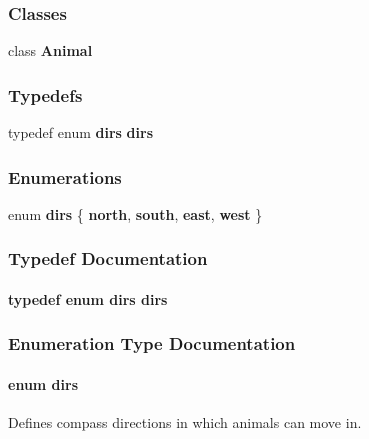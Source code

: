 \subsubsection*{Classes}
\begin{DoxyCompactItemize}
\item 
class {\bf Animal}
\end{DoxyCompactItemize}
\subsubsection*{Typedefs}
\begin{DoxyCompactItemize}
\item 
typedef enum {\bf dirs} {\bf dirs}
\end{DoxyCompactItemize}
\subsubsection*{Enumerations}
\begin{DoxyCompactItemize}
\item 
enum {\bf dirs} \{ {\bf north}, 
{\bf south}, 
{\bf east}, 
{\bf west}
 \}
\end{DoxyCompactItemize}


\subsubsection{Typedef Documentation}
\paragraph[{dirs}]{\setlength{\rightskip}{0pt plus 5cm}typedef enum {\bf dirs}
 {\bf dirs}}\label{_animal_8h_ab87e8be2cafe2008c5eaf36fd8e3cfb1}


\subsubsection{Enumeration Type Documentation}
\paragraph[{dirs}]{\setlength{\rightskip}{0pt plus 5cm}enum {\bf dirs}}\label{_animal_8h_aeac25a28aa4d3c6009f7249ee82ae12d}


Defines compass directions in which animals can move in. 

